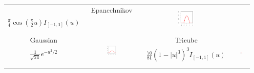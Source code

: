 \documentclass[pdf]{beamer}\usepackage[]{graphicx}\usepackage[]{color}
\begin{document}
\begin{frame}
{\begin{tabular}{cccc}
{}%
& 
Epanechnikov &
\multirow{4}{*}{
\includegraphics[width=0.18\textwidth]{figure/epanechnikov-1}
}%
\\
$\frac{\pi}{4}\cos\left(\frac{\pi}{2}u\right)I_{[-1,1]}(u)$ & &    $\frac{3}{4}(1-u^2)I_{[-1,1]}(u)$  & \\ & & & \\ & & & \\
Gaussian &
\multirow{4}{*}{
\includegraphics[width=0.18\textwidth]{figure/gaussian-1}
}%
& 
Tricube &
\multirow{4}{*}{
\includegraphics[width=0.18\textwidth]{figure/tricube-1}
}%
\\
$\frac{1}{\sqrt{2\pi}} e^{-u^2/2}$ & & $\frac{70}{81}(1-|u|^3)^3I_{[-1,1]}(u)$ & \\ & & & \\ & & & \\

\end{tabular}
}


\end{frame}
\end{document}
